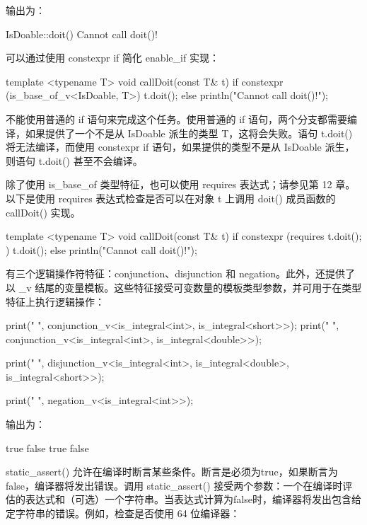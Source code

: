 输出为：

\begin{shell}
IsDoable::doit()
Cannot call doit()!
\end{shell}

可以通过使用 constexpr if 简化 enable\_if 实现：

\begin{cpp}
template <typename T>
void callDoit(const T& t)
{
    if constexpr (is_base_of_v<IsDoable, T>) {
        t.doit();
    } else {
        println("Cannot call doit()!");
    }
}
\end{cpp}

不能使用普通的 if 语句来完成这个任务。使用普通的 if 语句，两个分支都需要编译，如果提供了一个不是从 IsDoable 派生的类型 T，这将会失败。语句 t.doit() 将无法编译，而使用 constexpr if 语句，如果提供的类型不是从 IsDoable 派生，则语句 t.doit() 甚至不会编译。

除了使用 is\_base\_of 类型特征，也可以使用 requires 表达式；请参见第 12 章。以下是使用 requires 表达式检查是否可以在对象 t 上调用 doit() 成员函数的 callDoit() 实现。

\begin{cpp}
template <typename T>
void callDoit(const T& t)
{
    if constexpr (requires { t.doit(); }) {
        t.doit();
    } else {
        println("Cannot call doit()!");
    }
}
\end{cpp}


有三个逻辑操作符特征：conjunction、disjunction 和 negation。此外，还提供了以 \_v 结尾的变量模板。这些特征接受可变数量的模板类型参数，并可用于在类型特征上执行逻辑操作：

\begin{cpp}
print("{} ", conjunction_v<is_integral<int>, is_integral<short>>);
print("{} ", conjunction_v<is_integral<int>, is_integral<double>>);

print("{} ", disjunction_v<is_integral<int>, is_integral<double>,
                        is_integral<short>>);

print("{} ", negation_v<is_integral<int>>);
\end{cpp}

输出为：

\begin{shell}
true false true false
\end{shell}


static\_assert() 允许在编译时断言某些条件。断言是必须为true，如果断言为false，编译器将发出错误。调用 static\_assert() 接受两个参数：一个在编译时评估的表达式和（可选）一个字符串。当表达式计算为false时，编译器将发出包含给定字符串的错误。例如，检查是否使用 64 位编译器：


